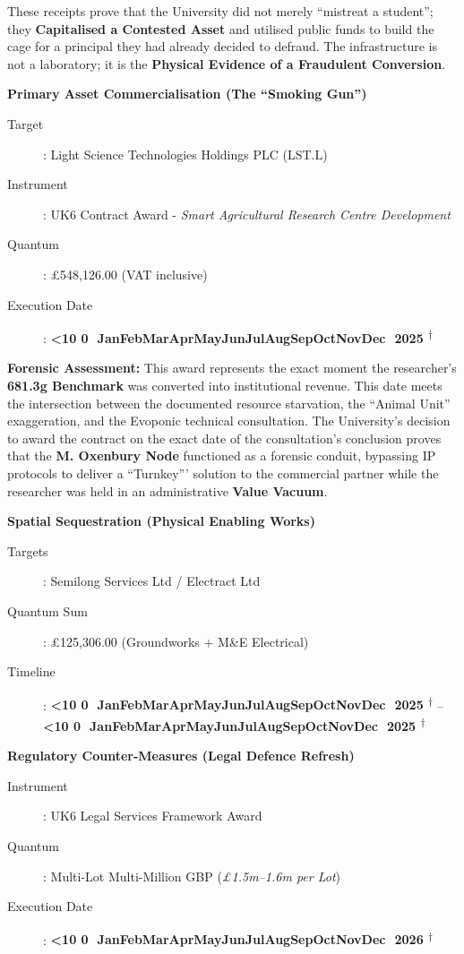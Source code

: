 \documentclass{EMBASSY}
\DeclareRobustCommand{\gmt}[3]{%
    \texorpdfstring{%
        {\color{DateGold}\textbf{%
            \ifnum#1<10 0\fi#1\,\textperiodcentered\,%
            \ifcase#2\or Jan\or Feb\or Mar\or Apr\or May\or Jun\or Jul\or Aug\or Sep\or Oct\or Nov\or Dec\fi
            \,\textperiodcentered\,20#3%
            \textsuperscript{$\dagger$}%
        }}%
    }{%
        (#1/#2/#3)%
    }%
}
\begin{document}
These receipts prove that the University did not merely ``mistreat a student''; they \textbf{Capitalised a Contested Asset} and utilised public funds to build the cage for a principal they had already decided to defraud. The infrastructure is not a laboratory; it is the \textbf{Physical Evidence of a Fraudulent Conversion}.

\dinkus

\noindent\textbf{Primary Asset Commercialisation (The ``Smoking Gun'')}
\begin{description}
	\item[Target]: Light Science Technologies Holdings PLC (LST.L)
	\item[Instrument]: UK6 Contract Award - \textit{Smart Agricultural Research Centre Development}
	\item[Quantum]: \pounds548,126.00 (VAT inclusive)
	\item[Execution Date]: \gmt{23}{10}{25}
\end{description}

\noindent\textbf{Forensic Assessment:} This award represents the exact moment the researcher’s \textbf{681.3g Benchmark} was converted into institutional revenue. This date meets the intersection between the documented resource starvation, the ``Animal Unit'' exaggeration, and the Evoponic technical consultation. The University’s decision to award the contract on the exact date of the consultation’s conclusion proves that the \textbf{M. Oxenbury Node} functioned as a forensic conduit, bypassing IP protocols to deliver a ``Turnkey''' solution to the commercial partner while the researcher was held in an administrative \textbf{Value Vacuum}.

\dinkus

\noindent\textbf{Spatial Sequestration (Physical Enabling Works)}
\begin{description}
	\item[Targets]: Semilong Services Ltd / Electract Ltd
	\item[Quantum Sum]: \pounds125,306.00 (Groundworks + M\&E Electrical)
	\item[Timeline]: \gmt{26}{10}{25}--\gmt{27}{10}{25}
\end{description}

\noindent\textbf{Regulatory Counter-Measures (Legal Defence Refresh)}
\begin{description}
	\item[Instrument]: UK6 Legal Services Framework Award
	\item[Quantum]: Multi-Lot Multi-Million GBP (\textit{\pounds1.5m--1.6m per Lot})
	\item[Execution Date]: \gmt{6}{2}{26}
\end{description}
\end{document}

